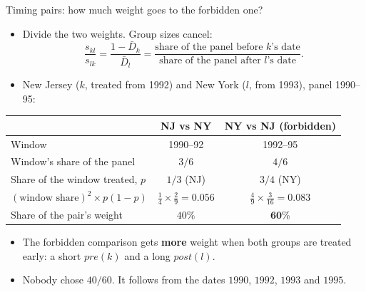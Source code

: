 \documentclass[
  11pt,
  ignorenonframetext,
  aspectratio=169,
]{beamer}
\providecommand{\tightlist}{%
  \setlength{\itemsep}{0pt}\setlength{\parskip}{0pt}}
\begin{document}
\begin{frame}{Timing pairs: how much weight goes to the forbidden one?}
\protect{}\label{timing-pairs-how-much-weight-goes-to-the-forbidden-one}
\begin{itemize}
\tightlist
\item
  Divide the two weights. Group sizes cancel: \[
  \frac{s_{kl}}{s_{lk}} = \frac{1 - \bar D_k}{\bar D_l} = \frac{\text{share of the panel before } k\text{'s date}}{\text{share of the panel after } l\text{'s date}} .
  \]
\item
  New Jersey (\(k\), treated from 1992) and New York (\(l\), from 1993),
  panel 1990--95:
\end{itemize}

\begin{center}\small
\begin{tabular}{lcc}
\toprule
 & NJ vs NY & NY vs NJ (forbidden) \\
\midrule
Window & 1990--92 & 1992--95 \\
Window's share of the panel & $3/6$ & $4/6$ \\
Share of the window treated, $p$ & $1/3$ (NJ) & $3/4$ (NY) \\
$(\text{window share})^2 \times p(1-p)$ & $\tfrac14 \times \tfrac29 = 0.056$ & $\tfrac49 \times \tfrac{3}{16} = 0.083$ \\
Share of the pair's weight & $40\%$ & $\mathbf{60\%}$ \\
\bottomrule
\end{tabular}
\end{center}

\begin{itemize}
\tightlist
\item
  The forbidden comparison gets \textbf{more} weight when both groups
  are treated early: a short \(pre(k)\) and a long \(post(l)\).
\item
  Nobody chose \(40/60\). It follows from the dates \(1990\), \(1992\),
  \(1993\) and \(1995\).
\end{itemize}
\end{frame}
\end{document}
